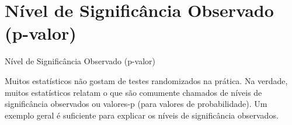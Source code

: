 \documentclass[12pt]{beamer}
\begin{document}
%
%
%

\section{Nível de Significância Observado (p-valor)}
\begin{frame}{Nível de Significância Observado (p-valor)}
\begin{block}{}
\justifying
Muitos estatísticos não gostam de testes randomizados na prática. %
Na verdade, muitos estatísticos relatam o que são comumente chamados de níveis de significância observados ou valores-p (para valores de probabilidade). Um exemplo geral é suficiente para explicar os níveis de significância observados.  
\end{block}
\end{frame}
\end{document}
